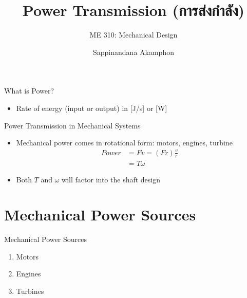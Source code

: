 \documentclass[
svgnames,
handout,
10pt,
]{beamer}
\author{Sappinandana Akamphon}
\institute{Thammasat University}
\title{Power Transmission \textthai{(การส่งกำลัง)}}
\subtitle{ME 310: Mechanical Design}
\date{}
\begin{document}
\begin{frame}
  \maketitle 
\end{frame}

\begin{frame}{What is Power?}
  \begin{itemize}
  \item Rate of energy (input or output) in [J/s] or [W]
  \end{itemize}
\end{frame}

\begin{frame}{Power Transmission in Mechanical Systems}
  \begin{itemize}
  \item Mechanical power comes in rotational form: motors, engines, turbine
  \begin{align*}
    Power &= F v = (F r) \frac{v}{r} \\
      &= T \omega
  \end{align*}
    \item Both $T$ and $\omega$ will factor into the shaft design
  \end{itemize}
\end{frame}

\section{Mechanical Power Sources}

\begin{frame}{Mechanical Power Sources}
  \begin{enumerate}
  \item Motors \\[1em]
  \item Engines \\[1em]
  \item Turbines
  \end{enumerate} 
\end{frame}
\end{document}
